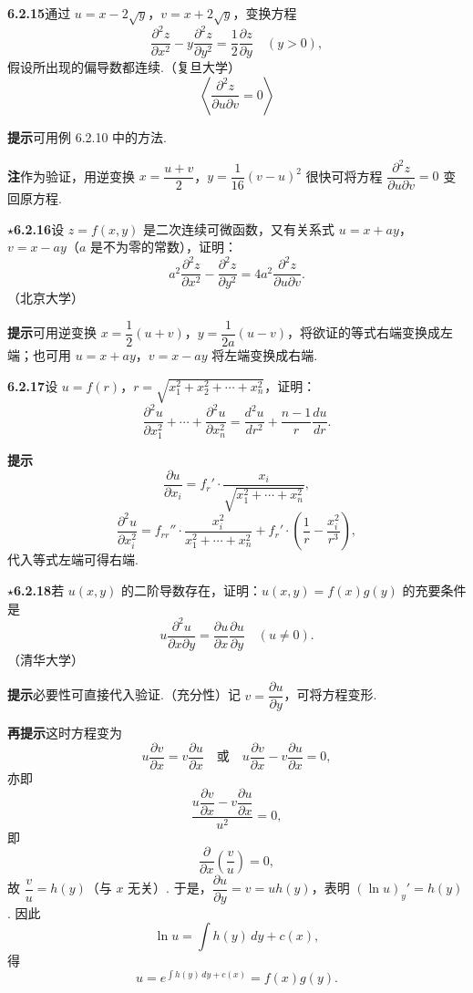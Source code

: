 \documentclass[UTF8, 12pt, fontset=fandol, oneside]{ctexart}
\begin{document}
\noindent\textbf{6.2.15}\quad 通过 $u=x-2\sqrt y$，$v=x+2\sqrt y$，变换方程
\[
  \frac{\partial^2z}{\partial x^2}-y\frac{\partial^2z}{\partial y^2}
  =\frac12\frac{\partial z}{\partial y}\quad (y>0),
\]
假设所出现的偏导数都连续.（复旦大学）
\[
  \left\langle \frac{\partial^2z}{\partial u\partial v}=0\right\rangle
\]

\noindent\textbf{提示}\quad 可用例 6.2.10 中的方法.

\noindent\textbf{注}\quad 作为验证，用逆变换 $x=\dfrac{u+v}{2}$，$y=\dfrac1{16}(v-u)^2$ 很快可将方程 $\dfrac{\partial^2z}{\partial u\partial v}=0$ 变回原方程.

\noindent\textbf{\ensuremath{\star}6.2.16}\quad 设 $z=f(x,y)$ 是二次连续可微函数，又有关系式 $u=x+ay$，$v=x-ay$（$a$ 是不为零的常数），证明：
\[
  a^2\frac{\partial^2z}{\partial x^2}-\frac{\partial^2z}{\partial y^2}
  =4a^2\frac{\partial^2z}{\partial u\partial v}.
\]
（北京大学）

\noindent\textbf{提示}\quad 可用逆变换 $x=\dfrac12(u+v)$，$y=\dfrac1{2a}(u-v)$，将欲证的等式右端变换成左端；也可用 $u=x+ay$，$v=x-ay$ 将左端变换成右端.

\noindent\textbf{6.2.17}\quad 设 $u=f(r)$，$r=\sqrt{x_1^2+x_2^2+\cdots+x_n^2}$，证明：
\[
  \frac{\partial^2u}{\partial x_1^2}+\cdots+\frac{\partial^2u}{\partial x_n^2}
  =\frac{d^2u}{dr^2}+\frac{n-1}{r}\frac{du}{dr}.
\]

\noindent\textbf{提示}\quad
\[
  \frac{\partial u}{\partial x_i}=f_r'\cdot\frac{x_i}{\sqrt{x_1^2+\cdots+x_n^2}},
\]
\[
  \frac{\partial^2u}{\partial x_i^2}
  =f_{rr}''\cdot\frac{x_i^2}{x_1^2+\cdots+x_n^2}
  +f_r'\cdot\left(\frac1r-\frac{x_i^2}{r^3}\right),
\]
代入等式左端可得右端.

\noindent\textbf{\ensuremath{\star}6.2.18}\quad 若 $u(x,y)$ 的二阶导数存在，证明：$u(x,y)=f(x)g(y)$ 的充要条件是
\[
  u\frac{\partial^2u}{\partial x\partial y}
  =\frac{\partial u}{\partial x}\frac{\partial u}{\partial y}\quad(u\ne0).
\]
（清华大学）

\noindent\textbf{提示}\quad 必要性可直接代入验证.（充分性）记 $v=\dfrac{\partial u}{\partial y}$，可将方程变形.

\noindent\textbf{再提示}\quad 这时方程变为
\[
  u\frac{\partial v}{\partial x}=v\frac{\partial u}{\partial x}
  \quad\text{或}\quad
  u\frac{\partial v}{\partial x}-v\frac{\partial u}{\partial x}=0,
\]
亦即
\[
  \frac{u\dfrac{\partial v}{\partial x}-v\dfrac{\partial u}{\partial x}}{u^2}=0,
\]
即
\[
  \frac{\partial}{\partial x}\left(\frac vu\right)=0,
\]
故 $\dfrac vu=h(y)$（与 $x$ 无关）. 于是，$\dfrac{\partial u}{\partial y}=v=uh(y)$，表明 $(\ln u)_y'=h(y)$. 因此
\[
  \ln u=\int h(y)\,dy+c(x),
\]
得
\[
  u=e^{\int h(y)\,dy+c(x)}=f(x)g(y).
\]
\end{document}
